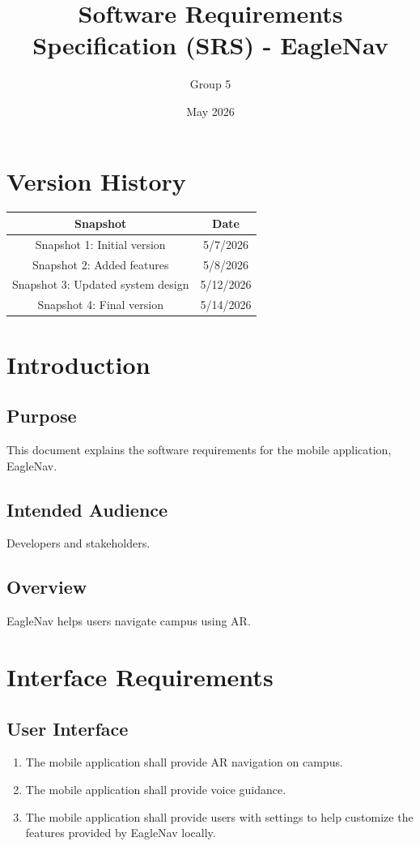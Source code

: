 \documentclass{article}
\title{Software Requirements Specification (SRS) - EagleNav}
\author{Group 5}
\date{May 2026}
\begin{document}
\maketitle
\clearpage

\tableofcontents
\newpage

\section{Version History}
\begin{table}[h!]
	\begin{tabular}{|c|c|}
		\hline
		\textbf{Snapshot} & \textbf{Date} \\
		\hline
		Snapshot 1: Initial version & 5/7/2026 \\
		Snapshot 2: Added features & 5/8/2026 \\
		Snapshot 3: Updated system design & 5/12/2026 \\
		Snapshot 4: Final version & 5/14/2026 \\
		\hline
	\end{tabular}
\end{table}

\section{Introduction}
\subsection{Purpose}
This document explains the software requirements for the mobile application, EagleNav.

\subsection{Intended Audience}
Developers and stakeholders.

\subsection{Overview}
EagleNav helps users navigate campus using AR.

\newpage
\section{Interface Requirements}
\subsection{User Interface}
\begin{enumerate}
\item{The mobile application shall provide AR navigation on campus.}
\item{The mobile application shall provide voice guidance.}
\item{The mobile application shall provide users with settings to help customize the features provided by EagleNav locally.}
\end{enumerate}
\end{document}
